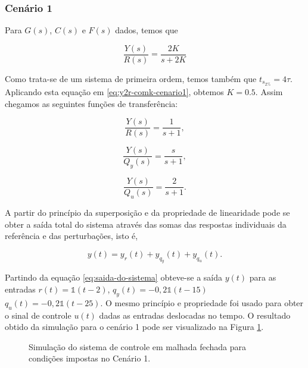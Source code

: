 \subsubsection{Cenário 1}
\label{subsub:cenario1}
Para $G(s)$, $C(s)$ e $F(s)$ dados, temos que

\begin{equation}
    \label{eq:y2r-comk-cenario1}
    \frac{Y(s)}{R(s)} = \frac{2K}{s + 2K}
\end{equation}

Como trata-se de um sistema de primeira ordem, temos também que $t_{s_{2\%}} =
4\tau$. Aplicando esta equação em \ref{eq:y2r-comk-cenario1}, obtemos $K = 0.5$.
Assim chegamos as seguintes funções de transferência:

\begin{equation}
    \label{eq:y2r-cenario1}
    \frac{Y(s)}{R(s)} = \frac{1}{s + 1},
\end{equation}

\begin{equation}
    \label{eq:y2qy-cenario1}
    \frac{Y(s)}{Q_{y}(s)} = \frac{s}{s + 1},
\end{equation}

\begin{equation}
    \label{eq:y2qu-cenario1}
    \frac{Y(s)}{Q_{u}(s)} = \frac{2}{s + 1}.
\end{equation}

A partir do princípio da superposição e da propriedade de linearidade pode se
obter a saída total do sistema através das somas das respostas individuais da
referência e das perturbações, isto é,

\begin{equation}
    \label{eq:saida-do-sistema}
    y(t) = y_{r}(t) + y_{q_{y}}(t) + y_{q_{u}}(t).
\end{equation}

Partindo da equação \ref{eq:saida-do-sistema} obteve-se a saída $y(t)$ para as
entradas $r(t) = \mathds{1}(t - 2)$, $q_{y}(t) = -0,2\mathds{1}(t - 15)$
$q_{u}(t) = -0,2\mathds{1}(t - 25)$. O mesmo princípio e propriedade foi usado
para obter o sinal de controle $u(t)$ dadas as entradas deslocadas no tempo. O
resultado obtido da simulação para o cenário 1 pode ser visualizado na Figura 
\ref{fig:resultado-desafio1-cenario1}.

\begin{figure}[!ht]
    \caption{Simulação do sistema de controle em malhada fechada para condições
    impostas no Cenário 1.}
    \vspace{-10pt}
    \hspace{-30pt}
    \label{fig:resultado-desafio1-cenario1}
    \begin{minipage}{\linewidth}
        
    \end{minipage}
\end{figure}

